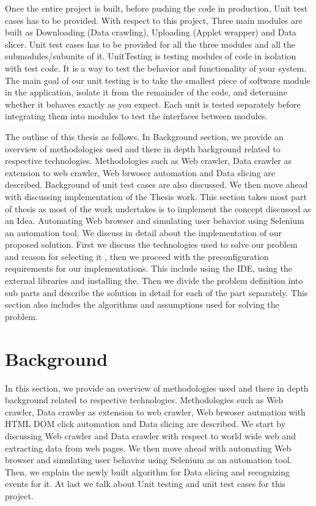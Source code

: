 \documentclass[article,type=msc,colorback,accentcolor=tud9c,twoside,11pt]{tudthesis}
\begin{document}
Once the entire project is built, before pushing the code in production, Unit test cases has to be provided. With respect to this project, Three main modules are built as Downloading (Data crawling), Uploading (Applet wrapper) and Data slicer. Unit test cases has to be provided for all the three modules and all the submodules/subunits of it. UnitTesting\cite{EffectivnessofUnitTest} is testing modules of code in isolation with test code. It is a way to test the behavior and functionality of your system. The main goal of our unit testing is to take the smallest piece of software module in the application, isolate it from the remainder of the code, and determine whether it behaves exactly as you expect. Each unit is tested separately before integrating them into modules to test the interfaces between modules.


The outline of this thesis as follows. In Background section, we provide an overview of methodologies used and there in depth background related to
respective technologies. Methodologies such as Web crawler, Data crawler as extension to web crawler, Web brwoser automation and Data slicing are described. Background of unit test cases are also discussed. We then move ahead with discussing implementation of the Thesis work. This section takes most part of thesis as most of the work undertakes is to implement the concept discussed as an Idea. Automating Web browser and simulating user behavior using Selenium an automation tool. We discuss in detail about the implementation of our proposed solution. First we discuss the technologies used to solve our problem and reason for selecting it , then we proceed with the preconfiguration requirements for our implementations. This include using the IDE, using the external libraries and installing the. Then we divide the problem definition into sub parts and describe the solution in detail for each of the part separately. This section also includes the algorithms and assumptions used for solving the problem.

\clearpage
\section{Background}
In this section, we provide an overview of methodologies used and there in depth background related to respective technologies. Methodologies such as Web crawler, Data crawler as extension to web crawler, Web brwoser autmation with HTML DOM click automation and Data slicing are described. We start by discussing Web crawler and Data crawler with respect to world wide web and extracting data from web pages. We then move ahead with automating Web browser and simulating user behavior using Selenium as an automation tool. Then, we explain the newly built algorithm for Data slicing and recognizing events for it. At last we talk about Unit testing and unit test cases for this project.
\end{document}
